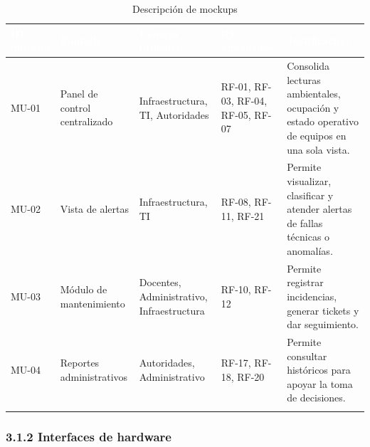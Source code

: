 \begingroup
\small
\begin{longtable}{|p{3.1cm}|p{3.1cm}|p{3.1cm}|p{3.1cm}|p{3.1cm}|}
\hline
\cellcolor{sigagreen}\textcolor{white}{\textbf{ID mockup}} & \cellcolor{sigagreen}\textcolor{white}{\textbf{Pantalla}} & \cellcolor{sigagreen}\textcolor{white}{\textbf{Usuario principal}} & \cellcolor{sigagreen}\textcolor{white}{\textbf{RF vinculados}} & \cellcolor{sigagreen}\textcolor{white}{\textbf{Justificación}} \\ \hline
MU-01 & Panel de control centralizado & Infraestructura, TI, Autoridades & RF-01, RF-03, RF-04, RF-05, RF-07 & Consolida lecturas ambientales, ocupación y estado operativo de equipos en una sola vista. \\ \hline
MU-02 & Vista de alertas & Infraestructura, TI & RF-08, RF-11, RF-21 & Permite visualizar, clasificar y atender alertas de fallas técnicas o anomalías. \\ \hline
MU-03 & Módulo de mantenimiento & Docentes, Administrativo, Infraestructura & RF-10, RF-12 & Permite registrar incidencias, generar tickets y dar seguimiento. \\ \hline
MU-04 & Reportes administrativos & Autoridades, Administrativo & RF-17, RF-18, RF-20 & Permite consultar históricos para apoyar la toma de decisiones. \\ \hline
\caption{Descripción de mockups}
\end{longtable}
\endgroup

\subsubsection*{3.1.2 Interfaces de hardware}


